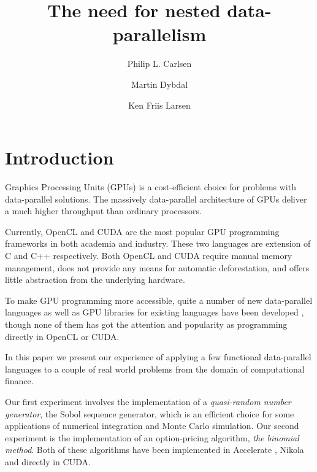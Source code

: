 \documentclass{llncs2e/llncs}
\title{The need for nested data-parallelism}
\author{Philip L. Carlsen \and Martin Dybdal \and Ken Friis Larsen}
\institute{University of Copenhagen \\ \email{plcplc@gmail.com,
    dybber@dybber.dk, kflarsen@diku.dk}}
\begin{document}
\maketitle

\section{Introduction}
Graphics Processing Units (GPUs) is a cost-efficient choice for
problems with data-parallel solutions. The massively data-parallel
architecture of GPUs deliver a much higher throughput than ordinary
processors.

Currently, OpenCL and CUDA are the most popular GPU programming
frameworks in both academia and industry. These two languages are
extension of C and C++ respectively. Both OpenCL and CUDA require manual
memory management, does not provide any means for automatic
deforestation, and offers little abstraction from the underlying
hardware.

To make GPU programming more accessible, quite a number of new
data-parallel languages as well as GPU libraries for existing
languages have been developed \cite{Catanzaro2011,
  chakravarty2011accelerating, mainland2010nikola,
  svensson2011obsidian, bergstra2010theano, homepage:rgpu,
  bergstrom2012nested}, though none of them has got the attention and
popularity as programming directly in OpenCL or CUDA.

In this paper we present our experience of applying a few functional
data-parallel languages to a couple of real world problems from the
domain of computational finance.

Our first experiment involves the implementation of a
\emph{quasi-random number generator}, the Sobol sequence generator,
which is an efficient choice for some applications of numerical
integration and Monte Carlo simulation. Our second experiment is the
implementation of an option-pricing algorithm, \emph{the binomial
  method}. Both of these algorithms have been implemented in
Accelerate \cite{chakravarty2011accelerating}, Nikola
\cite{mainland2010nikola} and directly in CUDA.
\end{document}

